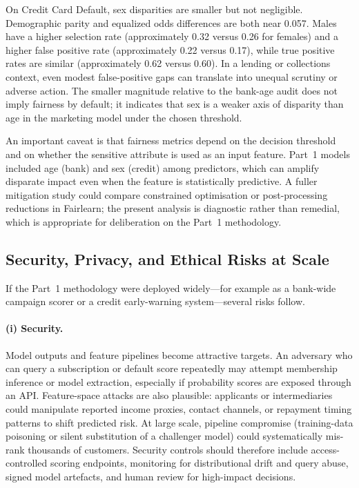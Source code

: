 On Credit Card Default, sex disparities are smaller but not negligible.
Demographic parity and equalized odds differences are both near 0.057.
Males have a higher selection rate (approximately 0.32 versus 0.26 for females)
and a higher false positive rate (approximately 0.22 versus 0.17), while true
positive rates are similar (approximately 0.62 versus 0.60). In a lending or
collections context, even modest false-positive gaps can translate into unequal
scrutiny or adverse action. The smaller magnitude relative to the bank-age audit
does not imply fairness by default; it indicates that sex is a weaker axis of
disparity than age in the marketing model under the chosen threshold.

An important caveat is that fairness metrics depend on the decision threshold
and on whether the sensitive attribute is used as an input feature. Part~1
models included age (bank) and sex (credit) among predictors, which can amplify
disparate impact even when the feature is statistically predictive. A fuller
mitigation study could compare constrained optimisation or post-processing
reductions in Fairlearn; the present analysis is diagnostic rather than
remedial, which is appropriate for deliberation on the Part~1 methodology.

\subsection{Security, Privacy, and Ethical Risks at Scale}
\label{sec:part2-risks}

If the Part~1 methodology were deployed widely---for example as a bank-wide
campaign scorer or a credit early-warning system---several risks follow.

\paragraph{(i) Security.}
Model outputs and feature pipelines become attractive targets. An adversary who
can query a subscription or default score repeatedly may attempt membership
inference or model extraction, especially if probability scores are exposed
through an API. Feature-space attacks are also plausible: applicants or
intermediaries could manipulate reported income proxies, contact channels, or
repayment timing patterns to shift predicted risk. At large scale, pipeline
compromise (training-data poisoning or silent substitution of a challenger
model) could systematically mis-rank thousands of customers. Security controls
should therefore include access-controlled scoring endpoints, monitoring for
distributional drift and query abuse, signed model artefacts, and human review
for high-impact decisions.

